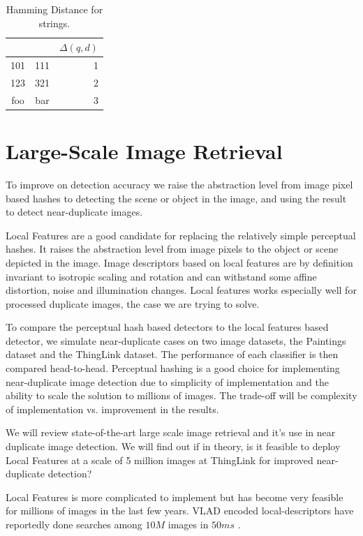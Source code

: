 \documentclass[english,12pt,a4paper,pdftex,elec,utf8, table]{aaltothesis}
\begin{document}
\begin{table}[htb]
\caption{Hamming Distance for strings.}
\label{hammingexamples}
\begin{center}
  \begin{tabular}{ccr}
&&$\Delta(q,d)$\\
    \hline \hline
    101 & 111 & 1\\
    \hline
    123 & 321 & 2\\
    \hline
    foo & bar & 3\\
    \hline
\end{tabular}
\end{center}\end{table}

\clearpage
\section{Large-Scale Image Retrieval}
To improve on detection accuracy we raise the abstraction level from image pixel based hashes to detecting the scene or object in the image, and using the result to detect near-duplicate images.

Local Features are a good candidate for replacing the relatively simple perceptual hashes. It raises the abstraction level from image pixels to the object or scene depicted in the image. Image descriptors based on local features are by definition invariant to isotropic scaling and rotation and can withstand some affine distortion, noise and illumination changes. Local features works especially well for processed duplicate images, the case we are trying to solve.

To compare the perceptual hash based detectors to the local features based detector, we simulate near-duplicate cases on two image datasets, the Paintings dataset and the ThingLink dataset. The performance of each classifier is then compared head-to-head. Perceptual hashing is a good choice for implementing near-duplicate image detection due to simplicity of implementation and the ability to scale the solution to millions of images. The trade-off will be complexity of implementation vs. improvement in the results.

We will review state-of-the-art large scale image retrieval and it's use in near duplicate image detection. We will find out if in theory, is it feasible to deploy Local Features at a scale of 5 million images at ThingLink for improved near-duplicate detection?

Local Features is more complicated to implement but has become very feasible for millions of images in the last few years. VLAD encoded local-descriptors have reportedly done searches among $10M$ images in $50ms$ \cite{Jegou2010}.
\end{document}

